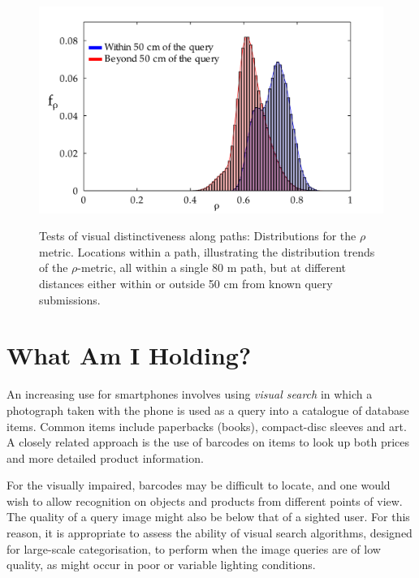 \begin{figure}[ht]
\centering
{\includegraphics[width=\linewidth]{./gfx/Chapter02/C5distributions_no_smoothingWithSmoothedHistograms-latex.pdf}}
\caption{Tests of visual distinctiveness along paths: Distributions for the $\rho$ metric. Locations within a path, illustrating the distribution trends of the $\rho$-metric, all within a single 80 m path, but at different distances either within or outside 50 cm from known query submissions.}        
\label{fig:rhoDistribution}
\end{figure}



\section{What Am I Holding?}

An increasing use for smartphones involves using \textit{visual search} in which a photograph taken with the phone is used as a query into a catalogue of database items.  Common items include paperbacks (books), compact-disc sleeves and art.  A closely related approach is the use of barcodes on items to look up both prices and more detailed product information.  

For the visually impaired, barcodes may be difficult to locate, and one would wish to allow recognition on objects and products from different points of view. The quality of a query image might also be below that of a sighted user.  For this reason, it is appropriate to assess the ability of visual search algorithms, designed for large-scale categorisation, to perform when the image queries are of low quality, as might occur in poor or variable lighting conditions.

